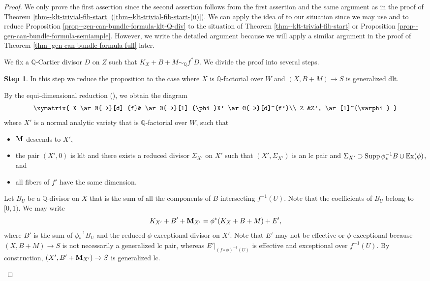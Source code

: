 \documentclass[12pt]{amsart}
\theoremstyle{definition}
\newtheorem{step3}{Step}
\begin{document}
\begin{proof}
We only prove the first assertion since the second assertion follows from the first assertion and the same argument as in the proof of Theorem \ref{thm--klt-trivial-fib-start} (\ref{thm--klt-trivial-fib-start-(ii)}). 
We can apply the idea of \cite[Proof of Theorem 1.4]{filipazzi-gen-can-bundle-formula} to our situation since we may use \cite{fujino-analytic-bchm} and \cite{eh-semistablereduction} to reduce Proposition \ref{prop--gen-can-bundle-formula-klt-Q-div} to the situation of Theorem \ref{thm--klt-trivial-fib-start} or  Proposition \ref{prop--gen-can-bundle-formula-semiample}. 
However, %
we write the detailed argument because we will apply a similar argument in the proof of Theorem \ref{thm--gen-can-bundle-formula-full} later. 

We fix a $\mathbb{Q}$-Cartier divisor $D$ on $Z$ such that $K_{X}+B+M \sim_{\mathbb{Q}}f^{*}D$. 
We divide the proof into several steps. 

\begin{step3}\label{step1--prop--gen-can-bundle-formula-klt-Q-div}
In this step we reduce the proposition to the case where $X$ is $\mathbb{Q}$-factorial over $W$ and $(X,B+M) \to S$ is generalized dlt. 

By the equi-dimensional reduction (\cite{eh-semistablereduction}), we obtain the diagram
 $$
\xymatrix{
X \ar@{->}[d]_{f}& \ar@{->}[l]_{\phi}X' \ar@{->}[d]^{f'}\\
Z &Z', \ar[l]^{\varphi}
}
$$
where $X'$ is a normal analytic variety that is $\mathbb{Q}$-factorial over $W$, such that
\begin{itemize}
\item
$\boldsymbol{\rm M}$ descends to $X'$, 
\item
 the pair $(X',0)$ is klt and there exists a reduced divisor $\Sigma_{X'}$ on $X'$ such that  $(X',\Sigma_{X'})$ is an lc pair and $\Sigma_{X'}\supset {\rm Supp}\,\phi^{-1}_{*}B\cup {\rm Ex}(\phi)$, and
\item
all fibers of $f'$ have the same dimension. 
\end{itemize}
Let $B_{U}$ be a $\mathbb{Q}$-divisor on $X$ that is the sum of all the components of $B$ intersecting $f^{-1}(U)$. 
Note that the coefficients of $B_{U}$ belong to $[0,1)$. 
We may write
$$K_{X'}+B'+\boldsymbol{\rm M}_{X'}=\phi^{*}(K_{X}+B+M)+E',$$
where $B'$ is the sum of $\phi^{-1}_{*}B_{U}$ and the reduced $\phi$-exceptional divisor on $X'$. 
Note that $E'$ may not be effective or $\phi$-exceptional because $(X,B+M) \to S$ is not necessarily a generalized lc pair, whereas $E'|_{(f \circ \phi)^{-1}(U)}$ is effective and exceptional over $f^{-1}(U)$. 
By construction, $(X',B'+\boldsymbol{\rm M}_{X'}) \to S$ is generalized lc. 


\end{step3}
\end{proof}
\end{document}
